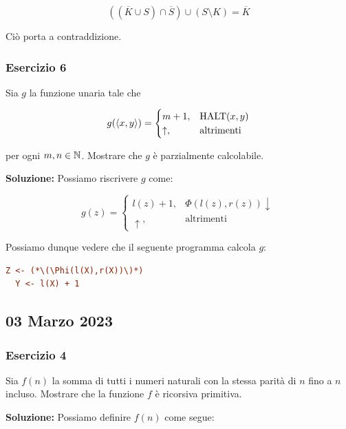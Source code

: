 \begin{equation}
  ((\overline{K} \cup S) \cap \overline{S} )\cup (S \setminus K) = \overline{K}
\end{equation}

Ciò porta a contraddizione.

\subsubsection{Esercizio 6}

Sia \(g\) la funzione unaria tale che

\begin{equation}
  g(\displaystyle{\left\langle{x,y}\right\rangle}) = \begin{cases}
    m+1, & \text{HALT}(x,y)\\
    \uparrow, & \text{altrimenti}
  \end{cases}
\end{equation}

per ogni \(m,n \in \mathbb{N}\). Mostrare che \(g\) è parzialmente calcolabile.

\textbf{Soluzione: } Possiamo riscrivere \(g\) come:

\begin{equation}
  g(z)= \begin{cases}
    l(z)+1, & \Phi(l(z),r(z)) \downarrow\\
    \uparrow, & \text{altrimenti}
  \end{cases}
\end{equation}

Possiamo dunque vedere che il seguente programma calcola \(g\):

\begin{lstlisting}[language=ini, caption={ }]
  Z <- (*\(\Phi(l(X),r(X))\)*)
  Y <- l(X) + 1
\end{lstlisting}

\subsection{03 Marzo 2023}

\subsubsection{Esercizio 4}

Sia \(f(n)\) la somma di tutti i numeri naturali con la stessa parità di \(n\) fino a \(n\) incluso. Mostrare che la funzione \(f\) è ricorsiva primitiva.

\textbf{Soluzione: } Possiamo definire \(f(n)\) come segue:


